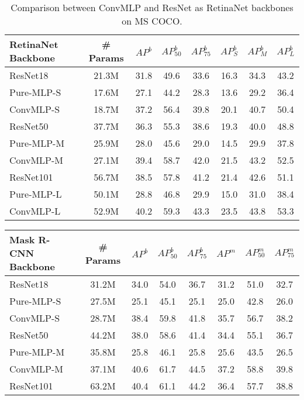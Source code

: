 \documentclass[final]{cvpr}
\begin{document}
\begin{table*}[!ht]
\centering
\begin{tabular}{l|c|ccc|ccc}
\toprule[2pt]
RetinaNet Backbone & \# Params & $AP^{b}$ & $AP^{b}_{50}$ & $AP^{b}_{75}$ & $AP^{b}_{S}$ & $AP^{b}_{M}$ & $AP^{b}_{L}$ \\ 
\midrule[1.5pt]
ResNet18~\cite{he2016deep} & 21.3M & 31.8 & 49.6 & 33.6 & 16.3 & 34.3 & 43.2\\
Pure-MLP-S & 17.6M &27.1 & 44.2 & 28.3 & 13.6 & 29.2 & 36.4 \\
ConvMLP-S & 18.7M & 37.2 & 56.4 & 39.8 & 20.1 & 40.7 & 50.4 \\
\midrule
ResNet50~\cite{he2016deep} & 37.7M & 36.3 & 55.3 & 38.6 & 19.3 & 40.0 & 48.8 \\
Pure-MLP-M & 25.9M &28.0 & 45.6 &29.0 &14.5 &29.9 &37.8 \\
ConvMLP-M & 27.1M & 39.4 & 58.7 & 42.0 & 21.5 & 43.2 & 52.5 \\
\midrule
ResNet101~\cite{he2016deep} & 56.7M & 38.5 & 57.8 & 41.2 & 21.4 & 42.6 & 51.1\\
Pure-MLP-L & 50.1M & 28.8 & 46.8 & 29.9 & 15.0 &31.0 &38.4 \\
ConvMLP-L & 52.9M & 40.2 & 59.3 & 43.3 & 23.5 & 43.8 & 53.3 \\
\bottomrule[2pt]
\end{tabular} 
\caption{Comparison between ConvMLP and ResNet as RetinaNet backbones on MS COCO.}
\label{tab:retinanet}
\end{table*} \begin{table*}[!ht]
\centering
\begin{tabular}{l|c|ccc|ccc}
\toprule[2pt]
Mask R-CNN Backbone & \# Params & $AP^{b}$ & $AP^{b}_{50}$ & $AP^{b}_{75}$ & $AP^{m}$ & $AP^{m}_{50}$ & $AP^{m}_{75}$ \\ 
\midrule[1.5pt]
ResNet18~\cite{he2016deep} & 31.2M & 34.0 & 54.0 & 36.7 & 31.2 & 51.0 & 32.7 \\
Pure-MLP-S & 27.5M & 25.1 & 45.1 & 25.1 & 25.0  & 42.8  & 26.0 \\
ConvMLP-S & 28.7M & 38.4 & 59.8 & 41.8 & 35.7 & 56.7 & 38.2 \\
\midrule
ResNet50~\cite{he2016deep} & 44.2M & 38.0 & 58.6 & 41.4 & 34.4 & 55.1 & 36.7 \\
Pure-MLP-M & 35.8M  & 25.8 & 46.1 &25.8 & 25.6 & 43.5 & 26.5 \\
ConvMLP-M & 37.1M & 40.6 & 61.7 & 44.5 & 37.2 & 58.8 & 39.8 \\
\midrule
ResNet101~\cite{he2016deep} & 63.2M & 40.4 & 61.1 & 44.2 & 36.4 & 57.7 & 38.8 \\

\end{tabular}
\end{table*}
\end{document}
